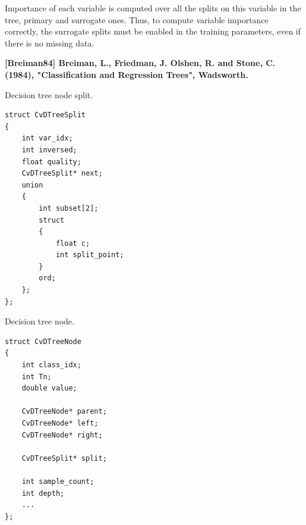 Importance of each variable is computed over all the splits on this variable in the tree, primary and surrogate ones. Thus, to compute variable importance correctly, the surrogate splits must be enabled in the training parameters, even if there is no missing data.

\textbf{[Breiman84] Breiman, L., Friedman, J. Olshen, R. and Stone, C. (1984), "Classification and Regression Trees", Wadsworth.}


Decision tree node split.

\begin{lstlisting}
struct CvDTreeSplit
{
    int var_idx;
    int inversed;
    float quality;
    CvDTreeSplit* next;
    union
    {
        int subset[2];
        struct
        {
            float c;
            int split_point;
        }
        ord;
    };
};
\end{lstlisting}

%
%


Decision tree node.

\begin{lstlisting}
struct CvDTreeNode
{
    int class_idx;
    int Tn;
    double value;

    CvDTreeNode* parent;
    CvDTreeNode* left;
    CvDTreeNode* right;

    CvDTreeSplit* split;

    int sample_count;
    int depth;
    ...
};
\end{lstlisting}

